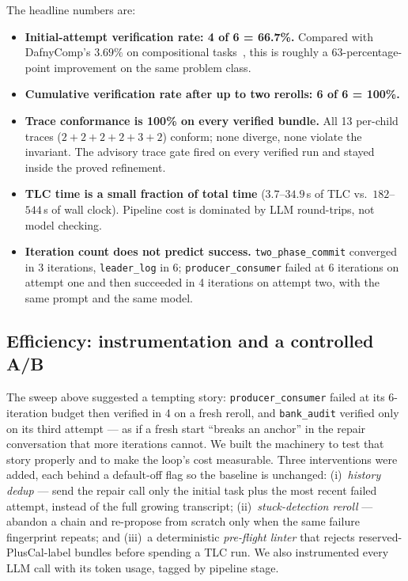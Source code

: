 \documentclass[11pt]{article}
\begin{document}
\noindent The headline numbers are:

\begin{itemize}\itemsep0pt
  \item \textbf{Initial-attempt verification rate: 4 of 6 = 66.7\%.}
    Compared with DafnyComp's $3.69\%$ on
    compositional tasks~\cite{dafnycomp2025}, this is roughly a
    63-percentage-point improvement on the same problem class.
  \item \textbf{Cumulative verification rate after up to two
    rerolls: 6 of 6 = 100\%.}
  \item \textbf{Trace conformance is 100\% on every verified
    bundle.} All 13 per-child traces ($2+2+2+2+3+2$) conform; none
    diverge, none violate the invariant. The advisory trace gate
    fired on every verified run and stayed inside the proved
    refinement.
  \item \textbf{TLC time is a small fraction of total time}
    ($3.7$--$34.9$\,s of TLC vs.\ $182$--$544$\,s of wall clock).
    Pipeline cost is dominated by LLM round-trips, not model
    checking.
  \item \textbf{Iteration count does not predict success.}
    \texttt{two\_phase\_commit} converged in 3 iterations,
    \texttt{leader\_log} in 6; \texttt{producer\_consumer} failed at
    6 iterations on attempt one and then succeeded in 4 iterations
    on attempt two, with the same prompt and the same model.
\end{itemize}

\subsection{Efficiency: instrumentation and a controlled A/B}\label{ssec:reroll}

The sweep above suggested a tempting story: \texttt{producer\_consumer} failed at
its 6-iteration budget then verified in 4 on a fresh reroll, and
\texttt{bank\_audit} verified only on its third attempt --- as if a fresh start
``breaks an anchor'' in the repair conversation that more iterations cannot. We
built the machinery to test that story properly and to make the loop's cost
measurable. Three interventions were added, each behind a default-off flag so the
baseline is unchanged: (i)~\emph{history dedup} --- send the repair call only the
initial task plus the most recent failed attempt, instead of the full growing
transcript; (ii)~\emph{stuck-detection reroll} --- abandon a chain and re-propose
from scratch only when the same failure fingerprint repeats; and (iii)~a
deterministic \emph{pre-flight linter} that rejects reserved-PlusCal-label bundles
before spending a TLC run. We also instrumented every LLM call with its token usage,
tagged by pipeline stage.
\end{document}
